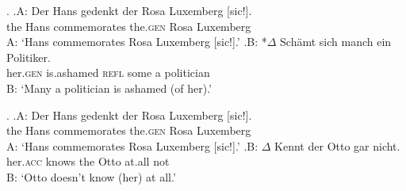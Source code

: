 \ex.\label{ex:td.trutkowski.nnvtd}
\ag.A: Der Hans gedenkt der Rosa Luxemberg [sic!].\\
{} the Hans commemorates the.\textsc{gen} Rosa Luxemberg\\
A: `Hans commemorates Rosa Luxemberg [sic!].'
\bg.B: *$\Delta$ Schämt sich manch ein Politiker.\\
{} \phantom{*}her.\textsc{gen} is.ashamed \textsc{refl} some a politician\\
B: `Many a politician is ashamed (of her).' \citep[NVTD impossible,][4, her judgment]{trutkowski2016}

\ex.\label{ex:td.trutkowski.nvtd}
\ag.A: Der Hans gedenkt der Rosa Luxemberg [sic!].\\
{} the Hans commemorates the.\textsc{gen} Rosa Luxemberg\\
A: `Hans commemorates Rosa Luxemberg [sic!].'
\bg.B: $\Delta$ Kennt der Otto gar nicht.\\
{} her.\textsc{acc} knows the Otto at.all not\\
B: `Otto doesn't know (her) at all.' \citep[NVTD possible,][4, her judgment]{trutkowski2016}

